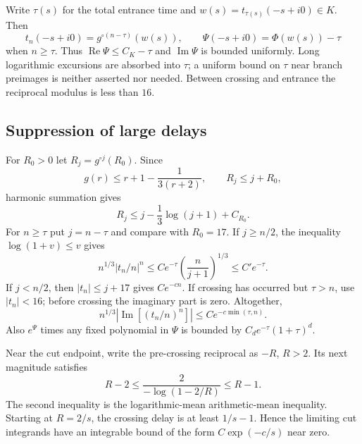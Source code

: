 \documentclass[11pt,letterpaper]{article}
\theoremstyle{remark}\newtheorem{remark}[theorem]{Remark}
\DeclareMathOperator{\Rea}{Re}
\DeclareMathOperator{\Ima}{Im}
\begin{document}
Write $\tau(s)$ for the total entrance time and $w(s)=t_{\tau(s)}(-s+i0)\in K$. Then
\begin{equation}\label{ibd:eq:entrance}
 t_n(-s+i0)=g^{\circ(n-\tau)}(w(s)),\qquad
 \Psi(-s+i0)=\Phi(w(s))-\tau
\end{equation}
when $n\geq\tau$. Thus $\Rea\Psi\leq C_K-\tau$ and $\Ima\Psi$ is bounded uniformly. Long logarithmic excursions are absorbed into $\tau$; a uniform bound on $\tau$ near branch preimages is neither asserted nor needed. Between crossing and entrance the reciprocal modulus is less than $16$.

\subsection{Suppression of large delays}
For $R_0>0$ let $R_j=g^{\circ j}(R_0)$. Since
\[
 g(r)\leq r+1-\frac1{3(r+2)},\qquad R_j\leq j+R_0,
\]
harmonic summation gives
\begin{equation}\label{ibd:eq:realbound}
 R_j\leq j-\frac13\log(j+1)+C_{R_0}.
\end{equation}
For $n\geq\tau$ put $j=n-\tau$ and compare with $R_0=17$. If $j\geq n/2$, the inequality $\log(1+v)\leq v$ gives
\[
 n^{1/3}|t_n/n|^n\leq C e^{-\tau}\left(\frac n{j+1}\right)^{1/3}\leq C' e^{-\tau}.
\]
If $j<n/2$, then $|t_n|\leq j+17$ gives $C e^{-c n}$. If crossing has occurred but $\tau>n$, use $|t_n|<16$; before crossing the imaginary part is zero. Altogether,
\begin{equation}\label{ibd:eq:delaybound}
 n^{1/3}\left|\Ima\!\left[(t_n/n)^n\right]\right|
 \leq C e^{-c\min(\tau,n)}.
\end{equation}
Also $e^{\Psi}$ times any fixed polynomial in $\Psi$ is bounded by
$C_d e^{-\tau}(1+\tau)^d$.

Near the cut endpoint, write the pre-crossing reciprocal as $-R$, $R>2$. Its next magnitude satisfies
\[
 R-2\leq\frac2{-\log(1-2/R)}\leq R-1.
\]
The second inequality is the logarithmic-mean arithmetic-mean inequality. Starting at $R=2/s$, the crossing delay is at least $1/s-1$. Hence the limiting cut integrands have an integrable bound of the form $C\exp(-c/s)$ near zero.
\end{document}
